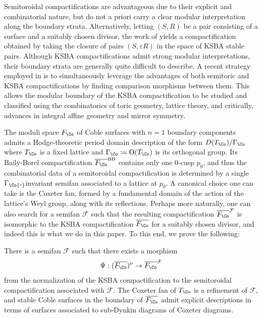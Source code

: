 \documentclass{amsart}
\begin{document}
\begin{remark}
Semitoroidal compactifications are advantageous due to their explicit and combinatorial nature, but do not a priori carry a clear modular interpretation along the boundary strata. Alternatively, letting \((S, R)\) be a pair consisting of a surface and a suitably chosen divisor, the work of \cite{kollar1988threefolds-and-deformations,alexeev1996moduli-spaces,Kol23} yields a compactification obtained by taking the closure of pairs \((S, \varepsilon R)\) in the space of KSBA stable pairs. Although KSBA compactifications admit strong modular interpretations, their boundary strata are generally quite difficult to describe. A recent strategy employed in \cite{alexeevCompactificationsModuliElliptic2023,AET23,AE22,AEGS23} is to simultaneously leverage the advantages of both semitoric and KSBA compactifications by finding comparison morphisms between them. This allows the modular boundary of the KSBA compactification to be studied and classified using the combinatorics of toric geometry, lattice theory, and critically, advances in integral affine geometry and mirror symmetry.

The moduli space \(F_\Co\) of Coble surfaces with \(n=1\) boundary components admits a Hodge-theoretic period domain description of the form \(D(T_\Co)/\Gamma_\Co\) where \(T_\Co\) is a fixed lattice and \(\Gamma_\Co \coloneqq{\operatorname{O}}(T_\Co)\) is its orthogonal group. Its Baily-Borel compactification \(\overline{F_{\Co}}^{\operatorname{BB}}\) contains only one 0-cusp \(p_0\), and thus the combinatorial data of a semitoroidal compactification is determined by a single \(\Gamma_\Co{\hbox{-}}\)invariant semifan associated to a lattice at \(p_0\). A canonical choice one can take is the Coxeter fan, formed by a fundamental domain of the action of the lattice's Weyl group, along with its reflections. Perhaps more naturally, one can also search for a semifan \({\mathcal{F}}\) such that the resulting compactification \(\overline{F_\Co}^{{\mathcal{F}}}\) is isomorphic to the KSBA compactification \(\overline{F_\Co}\) for a suitably chosen divisor, and indeed this is what we do in this paper. To this end, we prove the following:

\end{remark}

\begin{theorem}

There is a semifan \({\mathcal{F}}\) such that there exists a morphism \[
\Psi: (\overline{F_\Co})^{\nu} \to \overline{F_\Co}^{{\mathcal{F}}}
\] from the normalization of the KSBA compactification to the semitoroidal compactification associated with \({\mathcal{F}}\). The Coxeter fan of \(T_{\Co}\) is a refinement of \({\mathcal{F}}\), and stable Coble surfaces in the boundary of \(\overline{F_\Co}\) admit explicit descriptions in terms of surfaces associated to sub-Dynkin diagrams of Coxeter diagrams.

\end{theorem}
\end{document}

